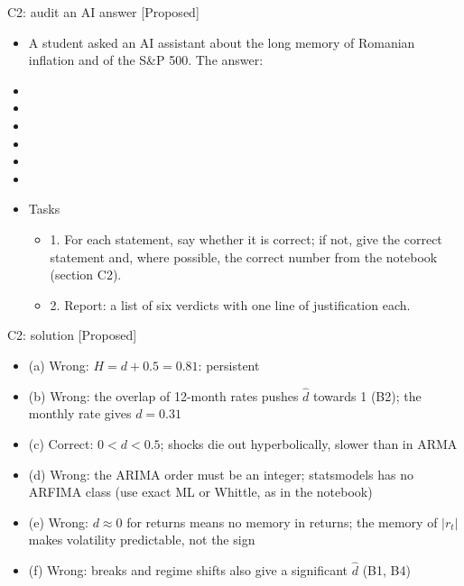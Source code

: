 \begin{frame}{C2: audit an AI answer [Proposed]}
\itemsize{\scriptsize}
\begin{itemize}
    \item A student asked an AI assistant about the long memory of Romanian inflation and of the S\&P 500. The answer:
    \item {}
    \item {}
    \item {}
    \item {}
    \item {}
    \item {}
    \item Tasks
    \begin{itemize}
        \item 1. For each statement, say whether it is correct; if not, give the correct statement and, where possible, the correct number from the notebook (section C2).
        \item 2. Report: a list of six verdicts with one line of justification each.
    \end{itemize}
\end{itemize}
\end{frame}

\ifsolutions
\begin{frame}{C2: solution [Proposed]}
\itemsize{\scriptsize}
\begin{itemize}
    \item (a) Wrong: $H = d + 0.5 = 0.81$: persistent
    \item (b) Wrong: the overlap of 12-month rates pushes $\hat d$ towards 1 (B2); the monthly rate gives $d = 0.31$
    \item (c) Correct: $0 < d < 0.5$; shocks die out hyperbolically, slower than in ARMA
    \item (d) Wrong: the ARIMA order must be an integer; statsmodels has no ARFIMA class (use exact ML or Whittle, as in the notebook)
    \item (e) Wrong: $d \approx 0$ for returns means no memory in returns; the memory of $|r_t|$ makes volatility predictable, not the sign
    \item (f) Wrong: breaks and regime shifts also give a significant $\hat d$ (B1, B4)
\end{itemize}
\end{frame}
\fi


